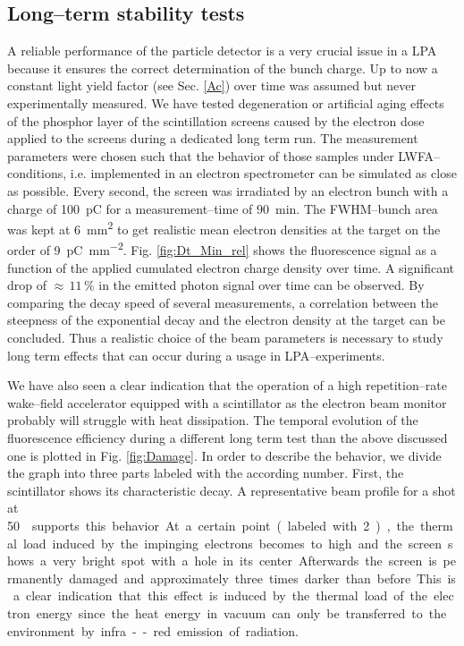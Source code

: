 \documentclass[%
reprint,
amsmath,
amssymb,
aip,
rsi, 
numerical,
floatfix,
]{revtex4-1}
\begin{document}
\subsection{\label{Ls}Long--term stability tests}
A reliable performance of the particle detector is a very crucial issue in a LPA because it ensures the correct determination of the bunch charge.
Up to now a constant light yield factor (see Sec. \ref{Ac}) over time was assumed but never experimentally measured. 
We have tested degeneration or artificial aging effects of the phosphor layer of the scintillation screens caused by the electron dose applied to the screens during a dedicated long term run.
The measurement parameters were chosen such that the behavior of those samples under LWFA--conditions, i.e. implemented in an electron spectrometer can be simulated as close as possible.
Every second, the screen was irradiated by an electron bunch with a charge of \SI{100}{\pico\coulomb} for a measurement--time of \SI{90}{\minute}.
The FWHM--bunch area was kept at \SI{6}{\square\milli\meter} to get realistic mean electron densities at the target on the order of \SI[per-mode=symbol]{9}{\pico\coulomb \per \square\milli\meter}. 
Fig. \ref{fig:Dt_Min_rel} shows the fluorescence signal as a function of the applied cumulated electron charge density over time. 
A significant drop of $\approx\, 11\,\%$ in the emitted photon signal over time can be observed.
By comparing the decay speed of several measurements, a correlation between the steepness of the exponential decay and the electron density at the target can be concluded.
Thus a realistic choice of the beam parameters is necessary to study long term effects that can occur during a usage in LPA--experiments.

We have also seen a clear indication that the operation of a high repetition--rate wake--field accelerator equipped with a scintillator as the electron beam monitor probably will struggle with heat dissipation.
The temporal evolution of the fluorescence efficiency during a different long term test than the above discussed one is plotted in Fig. \ref{fig:Damage}.
In order to describe the behavior, we divide the graph into three parts labeled with the according number. 
First, the scintillator shows its characteristic decay. 
A representative beam profile for a shot at \SI[per-mode=symbol]{50}{\nano\coulomb \per \milli\meter\square}  supports this behavior.
At a certain point (labeled with 2), the thermal load induced by the impinging electrons becomes to high and the screen shows a very bright spot with a hole in its center.
Afterwards the screen is permanently damaged and approximately three times darker than before.
This is a clear indication that this effect is induced by the thermal load of the electron energy since the heat energy in vacuum can only be transferred to the environment by infra--red emission of radiation.
\end{document}
